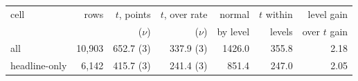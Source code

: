 \begin{tabular}{lrrrrrr}
\toprule
cell & rows & $t$, points & $t$, over rate & normal & $t$ within & level gain \\
 & & ($\nu$) & ($\nu$) & by level & levels & over $t$ gain \\
\midrule
all & 10,903 & 652.7 (3) & 337.9 (3) & 1426.0 & 355.8 & 2.18 \\
headline-only & 6,142 & 415.7 (3) & 241.4 (3) & 851.4 & 247.0 & 2.05 \\

\end{tabular}
